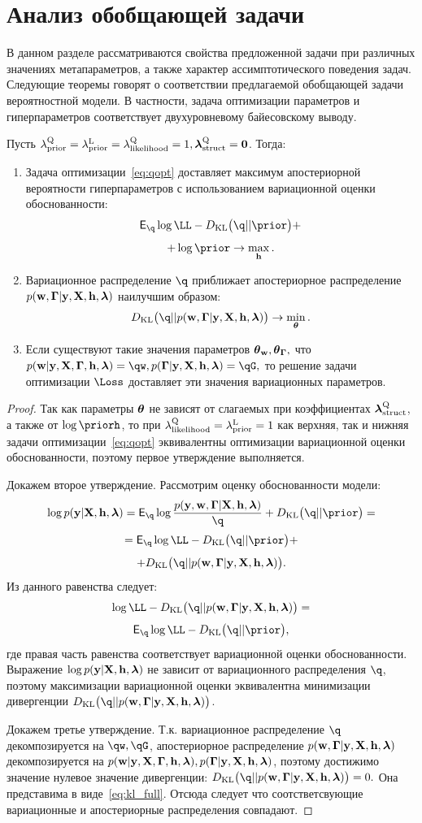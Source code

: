 \section{Анализ обобщающей задачи}
В данном разделе рассматриваются свойства предложенной задачи при различных значениях метапараметров, а также характер ассимптотического поведения задач.
Следующие теоремы говорят о соответствии предлагаемой обобщающей задачи вероятностной модели. В частности, задача оптимизации параметров и гиперпараметров соответствует двухуровневому байесовскому выводу.
\begin{theorem}
Пусть ${\lambda_\text{prior}^\text{Q}} = \lambda_\text{prior}^\text{L}=\lambda_\text{likelihood}^\text{Q} = 1, \boldsymbol{\lambda}_\text{struct}^\text{Q}=\mathbf{0}$. Тогда:
\begin{enumerate}
\item Задача оптимизации~\eqref{eq:qopt} доставляет максимум апостериорной вероятности гиперпараметров с использованием вариационной оценки обоснованности:
\vspace{-0.3cm}
\[
    \E_{\q}\log \LL - \KL{\q}{\prior} +
\]
\[
+ \log \prior \to \max_{\h}.
\]
\item Вариационное распределение $\q$ приближает апостериорное распределение $p(\mathbf{w}, \boldsymbol{\Gamma}|\mathbf{y}, \mathbf{X}, \mathbf{h},\boldsymbol{\lambda})$ наилучшим образом:
\vspace{-0.3cm}
\[
    \KL{\q}{\post} \to \min_{\teta}.
\]


\item Если существуют такие значения параметров $\boldsymbol{\theta}_\mathbf{w}, \boldsymbol{\theta}_{\boldsymbol{\Gamma}},$ что $\postw = \qw, \postG = \qG,$
то решение задачи оптимизации $\Loss$ доставляет эти значения вариационных параметров.  
\end{enumerate}
\end{theorem}
\begin{proof}
Так как параметры $\boldsymbol{\theta}$ не зависят от слагаемых при коэффициентах $\boldsymbol{\lambda}_\text{struct}^\text{Q}$, а также от $\log \priorh$, то 
при $\lambda_\text{likelihood}^\text{Q} = \lambda_\text{prior}^\text{L} = 1$ как верхняя, так и нижняя задачи оптимизации~\eqref{eq:qopt} эквивалентны оптимизации вариационной оценки обоснованности, поэтому первое утверждение выполняется.

Докажем второе утверждение. Рассмотрим оценку обоснованности модели: 
\[
\log \EV  = \E_{\q} \log\frac{p(\y, \w, \G|\X, \h, \lam)}{\q} + \KL{\q}{\prior} = 
 \]
\[
=\E_{\q} \log \LL - \KL{\q}{\prior}+
\]
\[
 + \KL{\q}{\post}.
\]
Из данного равенства следует:
\[
\log \LL - \KL{\q}{\post} = 
\]
\[
\E_{\q}\log \LL - \KL{\q}{\prior},
\]
где правая часть равенства соответствует вариационной оценки обоснованности. Выражение $\log p(\mathbf{y}|\mathbf{X}, \mathbf{h},\boldsymbol{\lambda})$ не зависит от вариационного распределения  $\q$, поэтому максимизации вариационной оценки эквивалентна минимизации дивергенции $\KL{\q}{\post}$.

Докажем третье утверждение. Т.к. вариационное распределение $\q$ декомпозируется на $\qw, \qG$, апостериорное распределение $p(\mathbf{w}, \boldsymbol{\Gamma}|\mathbf{y}, \mathbf{X}, \mathbf{h},\boldsymbol{\lambda})$ декомпозируется на $p(\mathbf{w}|\mathbf{y}, \mathbf{X}, \boldsymbol{\Gamma}, \mathbf{h},\boldsymbol{\lambda}), p(\boldsymbol{\Gamma}|\mathbf{y}, \mathbf{X}, \mathbf{h},\boldsymbol{\lambda})$, поэтому достижимо значение нулевое значение
дивергенции: $\KL{\q}{\post} = 0.$ Она представима в  виде~\eqref{eq:kl_full}.
Отсюда следует что соотстветсвующие вариационные и апостериорные распределения совпадают.
\end{proof}

